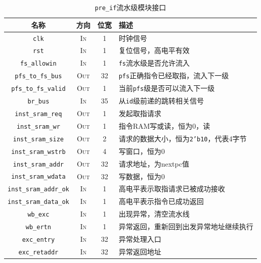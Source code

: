 \documentclass[UTF-8,twoside,c5size]{ctexart}
\begin{document}
	\begin{table}[!h]
		\centering
		\caption{\texttt{pre_if}流水级模块接口}
		\begin{tabularx}{\textwidth}{|c|c|c|Y|}
			\hline
			\textbf{名称} & \textbf{方向} & \textbf{位宽} & \textbf{描述} \\
			\hline
			\texttt{clk} & \textsc{In} & 1 & 时钟信号 \\
			\hline
			\texttt{rst} & \textsc{In} & 1 & 复位信号，高电平有效 \\
			\hline
			\texttt{fs_allowin} & \textsc{In} & 1 & \texttt{fs}流水级是否允许流入 \\
			\hline
			\texttt{pfs_to_fs_bus} & \textsc{Out} & 32 &  \texttt{pfs}正确指令已经取指，流入下一级\\
			\hline
			\texttt{pfs_to_fs_valid} & \textsc{Out} & 1 & 当前\texttt{pfs}级是否可以流入下一级 \\
			\hline
			\texttt{br_bus} & \textsc{In} & 35 & 从\texttt{id}级前递的跳转相关信号 \\
			\hline
			\texttt{inst_sram_req} & \textsc{Out} & 1 & 发起取指请求 \\
			\hline
			\texttt{inst_sram_wr} & \textsc{Out} & 1 & 指令RAM写或读，恒为0，读 \\
			\hline
			\texttt{inst_sram_size} & \textsc{Out} & 2 & 请求的数据大小，恒为\texttt{2'b10}，代表4字节 \\
			\hline
			\texttt{inst_sram_wstrb} & \textsc{Out} & 4 & 写窗口，恒为0 \\
			\hline
			\texttt{inst_sram_addr} & \textsc{Out} & 32 & 请求地址，为nextpc值 \\
			\hline
			\texttt{inst_sram_wdata} & \textsc{Out} & 32 & 写数据，恒为0 \\
			\hline
			\texttt{inst_sram_addr_ok} & \textsc{In} & 1 & 高电平表示取指请求已被成功接收 \\
			\hline
			\texttt{inst_sram_data_ok} & \textsc{In} & 1 & 高电平表示指令已成功返回 \\
			\hline
			\texttt{wb_exc} & \textsc{In} & 1 & 出现异常，清空流水线 \\
			\hline
			\texttt{wb_ertn} & \textsc{In} & 1 & 异常返回，重新回到出发异常地址继续执行 \\
			\hline
			\texttt{exc_entry} & \textsc{In} & 32 & 异常处理入口 \\
			\hline
			\texttt{exc_retaddr} & \textsc{In} & 32 & 异常返回地址 \\
			\hline
		\end{tabularx}
	\end{table}
\end{document}
